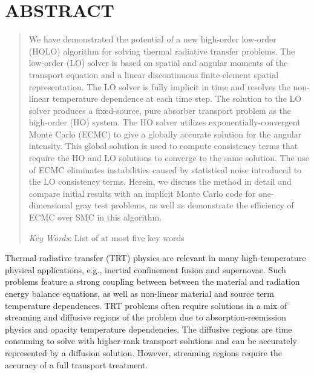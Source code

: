 \documentclass{mc2013}
\begin{document}
\section*{ABSTRACT} 
\begin{quote}
\begin{small}
We have demonstrated the potential of a new high-order low-order (HOLO) algorithm for solving
thermal radiative transfer problems.  The low-order (LO) solver is based on spatial
and angular moments of the transport equation and a linear discontinuous
finite-element spatial representation.  
The LO solver is fully implicit in time and resolves the non-linear
temperature dependence at each time step.  The solution to the LO solver produces a
fixed-source, pure absorber transport problem as the high-order (HO) system.  The HO solver
utilizes exponentially-convergent Monte Carlo (ECMC) to give a globally accurate solution
for the angular intensity.  This global solution is used to compute consistency terms
that require the HO and LO solutions to converge to the same solution.  The use of ECMC
eliminates instabilities caused by statistical noise introduced to the LO consistency
terms.  Herein, we discuss the method in detail and compare initial results with an
implicit Monte Carlo code for one-dimensional gray test problems, as well as
demonstrate the efficiency of ECMC over SMC in this algorithm.

\emph{Key Words}: List of at most five key words

\end{small} 
\end{quote}

\setlength{\baselineskip}{14pt}
\normalsize


Thermal radiative transfer (TRT) physics are relevant in many high-temperature physical applications,
e.g., inertial confinement fusion and supernovae.  Such problems feature a strong
coupling between between the material and radiation energy balance equations, as well
as non-linear material and source term temperature dependences.  TRT problems often require solutions in a mix of
streaming and diffusive regions of the problem due to absorption-reemission physics
and opacity temperature dependencies. The diffusive regions are time
consuming to solve with higher-rank transport solutions and can be accurately
represented by a diffusion solution.  However, streaming regions require the accuracy of
a full transport treatment. 
\end{document}
